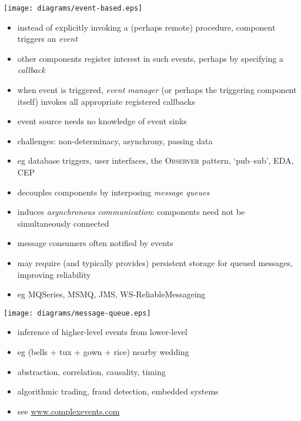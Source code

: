 \documentclass{sepslide-soa-faked} %
\begin{document}
\begin{slide}
\begin{center}
\texttt{[image: diagrams/event-based.eps]}
\end{center}
\end{slide}
\begin{slide}
  \begin{itemize}
  \item instead of explicitly invoking a (perhaps remote) procedure,
    component triggers an \emph{event}
  \item other components register interest in such events, perhaps by
    specifying a \emph{callback}
  \item when event is triggered, \emph{event manager} (or perhaps the
    triggering component itself) invokes all appropriate registered
    callbacks
  \item event source needs no knowledge of event sinks
  \item challenges: non-determinacy, asynchrony, passing data
  \item eg database triggers, user interfaces, the \textsc{Observer}
    pattern, `pub--sub', 
    EDA, %
    CEP %
  \end{itemize}
\end{slide}

\begin{slide}
  \begin{itemize}
  \item decouples components by interposing \emph{message queues}
  \item induces \emph{asynchronous communication}: components need not
    be simultaneously connected
  \item message consumers often notified by events
  \item may require (and typically provides) persistent storage for
    queued messages, improving reliability
  \item eg MQSeries, MSMQ, JMS, WS-ReliableMessageing
  \end{itemize}
\begin{center}
\texttt{[image: diagrams/message-queue.eps]}
\end{center}
\end{slide}

\begin{slide}
  \begin{itemize}
  \item inference of higher-level events from lower-level
  \item eg (bells + tux + gown + rice) nearby \maths{\Rightarrow} wedding
  \item abstraction, correlation, causality, timing
  \item algorithmic trading, fraud detection, embedded systems
  \item see \url{www.complexevents.com}
  \end{itemize}
\end{slide}
\end{document}
